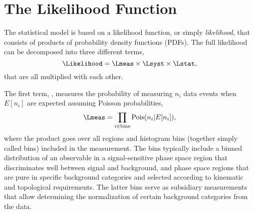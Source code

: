 
\section{The Likelihood Function}
\label{sec:likelihood}
The statistical model is based on a likelihood function, or simply \emph{likelihood}, that consists of products of probability density functions (PDFs). The full likelihood can be decomposed into three different terms,
\begin{equation}
    \label{eq:likelihood-three-terms}
    \Likelihood = \Lmeas \times \Lsyst \times \Lstat,
\end{equation}
that are all multiplied with each other.

The first term, \Lmeas, measures the probability of measuring $n_i$ data events when $E[n_i]$ are expected assuming Poisson probabilities, 
\begin{equation}
    \Lmeas = \prod_{i \in \text{bins}} \text{Pois}(n_i | E[n_i] ),
\end{equation}
where the product goes over all regions and histogram bins (together simply called bins) included in the measurement. The bins typically include a binned distribution of an observable in a signal-sensitive phase space region that discriminates well between signal and background, and phase space regions that are pure in specific background categories and selected according to kinematic and topological requirements. The latter bins serve as subsidiary measurements that allow determining the normalization of certain background categories from the data.

